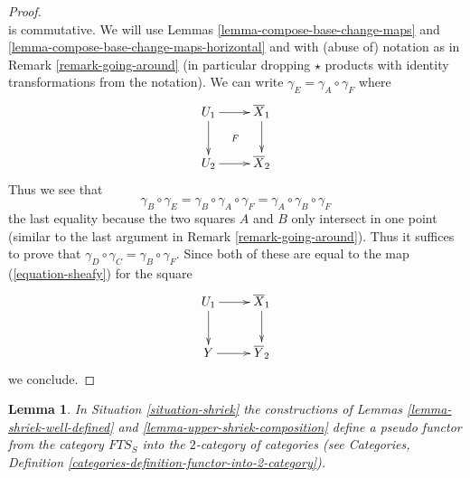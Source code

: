 \documentclass{stacks-project}
\theoremstyle{plain}
\newtheorem{lemma}[subsection]{Lemma}
\theoremstyle{definition}
\theoremstyle{remark}
\numberwithin{equation}{subsection}
\begin{document}
\begin{proof}
$${}
$$
is commutative. We will use
Lemmas \ref{lemma-compose-base-change-maps} and
\ref{lemma-compose-base-change-maps-horizontal}
and with (abuse of) notation as in
Remark \ref{remark-going-around} (in particular
dropping $\star$ products with identity transformations
from the notation).
We can write $\gamma_E = \gamma_A \circ \gamma_F$ where
$$
\xymatrix{
U_1 \ar[r] \ar[d] \ar@{}[rd]|F & \overline{X}_1 \ar[d] \\
U_2 \ar[r] & \overline{X}_2
}
$$
Thus we see that
$$
\gamma_B \circ \gamma_E = \gamma_B \circ \gamma_A  \circ \gamma_F
= \gamma_A \circ \gamma_B \circ \gamma_F
$$
the last equality because the two squares $A$ and $B$ only
intersect in one point (similar to the last argument in
Remark \ref{remark-going-around}). Thus it suffices to prove that
$\gamma_D \circ \gamma_C = \gamma_B \circ \gamma_F$.
Since both of these are equal to the map (\ref{equation-sheafy})
for the square
$$
\xymatrix{
U_1 \ar[r] \ar[d] & \overline{X}_1 \ar[d] \\
Y \ar[r] & \overline{Y}_2
}
$$
we conclude.
\end{proof}

\begin{lemma}
\label{lemma-pseudo-functor}
In Situation \ref{situation-shriek} the constructions of
Lemmas \ref{lemma-shriek-well-defined} and \ref{lemma-upper-shriek-composition}
define a pseudo functor from the category $\textit{FTS}_S$
into the $2$-category of categories (see Categories, Definition
\ref{categories-definition-functor-into-2-category}).
\end{lemma}
\end{document}
